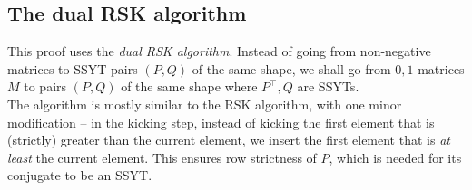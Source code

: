 \subsection{The dual RSK algorithm}

	This proof uses the \emph{dual RSK algorithm}. Instead of going from non-negative matrices to SSYT pairs $(P,Q)$ of the same shape, we shall go from $0,1$-matrices $M$ to pairs $(P,Q)$ of the same shape where $P^\top,Q$ are SSYTs.\\
	The algorithm is mostly similar to the RSK algorithm, with one minor modification -- in the kicking step, instead of kicking the first element that is (strictly) greater than the current element, we insert the first element that is \emph{at least} the current element. This ensures row strictness of $P$, which is needed for its conjugate to be an SSYT.

